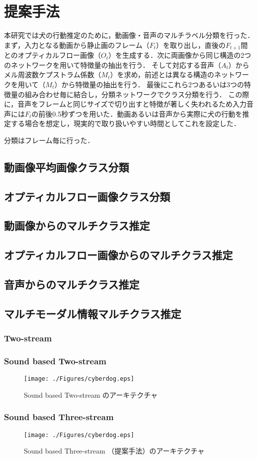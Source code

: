 \chapter{提案手法}
本研究では犬の行動推定のために，動画像・音声のマルチラベル分類を行った．
まず，入力となる動画から静止画のフレーム（$F_t$）を取り出し，直後の$F_{t+1}$間とのオプティカルフロー画像（$O_t$）を生成する．次に両画像から同じ構造の2つのネットワークを用いて特徴量の抽出を行う．
そして対応する音声（$A_t$）からメル周波数ケプストラム係数（$M_t$）を求め，前述とは異なる構造のネットワークを用いて（$M_t$）から特徴量の抽出を行う．
最後にこれら2つあるいは3つの特徴量の組み合わせ毎に結合し，分類ネットワークでクラス分類を行う．
この際に，音声をフレームと同じサイズで切り出すと特徴が著しく失われるため入力音声には$F_t$の前後0.5秒ずつを用いた．動画あるいは音声から実際に犬の行動を推定する場合を想定し，現実的で取り扱いやすい時間としてこれを設定した．

分類はフレーム毎に行った．
\section{動画像平均画像クラス分類}
\section{オプティカルフロー画像クラス分類}
\section{動画像からのマルチクラス推定}
\section{オプティカルフロー画像からのマルチクラス推定}
\section{音声からのマルチクラス推定}
\section{マルチモーダル情報マルチクラス推定}
\subsection{Two-stream}
\subsection{Sound based Two-stream}
\begin{figure}[htbp]
 \begin{center}
  \texttt{[image: ./Figures/cyberdog.eps]}
  \caption{Sound based Two-stream のアーキテクチャ}
  \label{sound-three-stream}
 \end{center}
\end{figure}
\subsection{Sound based Three-stream}
\begin{figure}[htbp]
 \begin{center}
  \texttt{[image: ./Figures/cyberdog.eps]}
  \caption{Sound based Three-stream （提案手法）のアーキテクチャ}
  \label{sound-three-stream}
 \end{center}
\end{figure}
